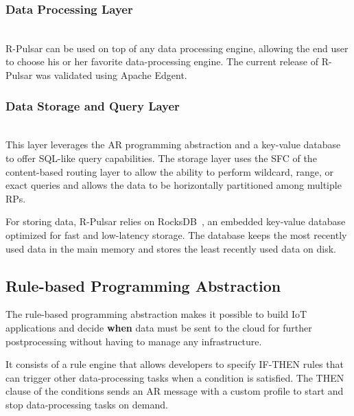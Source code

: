 \subsubsection{Data Processing Layer}
\hfill\\
R-Pulsar can be used on top of any data processing engine, allowing the end user to choose his or her favorite data-processing engine. The current release of R-Pulsar was validated using Apache Edgent. 

\subsubsection{Data Storage and Query Layer}
\hfill\\
This layer leverages the AR programming abstraction and a key-value database to offer SQL-like query capabilities. The storage layer uses the SFC of the content-based routing layer to allow the ability to perform wildcard, range, or exact queries and allows the data to be horizontally partitioned among multiple RPs. 

For storing data, R-Pulsar relies on RocksDB~\cite{rocks}, an embedded key-value database optimized for fast and low-latency storage. The database keeps the most recently used data in the main memory and stores the least recently used data on disk.

\subsection{Rule-based Programming Abstraction}\label{sec:programming-data}
The rule-based programming abstraction makes it possible to build IoT applications and decide \textbf{when} data must be sent to the cloud for further postprocessing without having to manage any infrastructure.

It consists of a rule engine that allows developers to specify IF-THEN rules that can trigger other data-processing tasks when a condition is satisfied. The THEN clause of the conditions sends an AR message with a custom profile to start and stop data-processing tasks on demand. %

